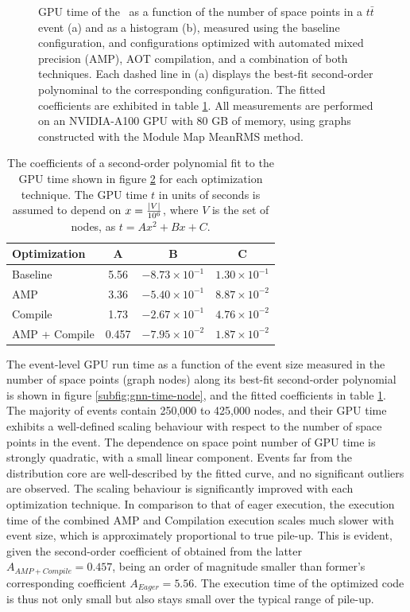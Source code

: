 \begin{figure}[h!]
\begin{subfigure}[b]{0.49\textwidth}
        \label{subfig:gnn-time-hist}
    \end{subfigure}
    \caption{GPU time of the \ignn~as a function of the number of space points in a $t\bar{t}$ event (a) and as a histogram (b), measured using the baseline configuration, and configurations optimized with automated mixed precision (AMP), AOT compilation, and a combination of both techniques. Each dashed line in (a) displays the best-fit second-order polynominal to the corresponding configuration. The fitted coefficients are exhibited in table \ref{tab:gnn-time-node-fit}. All measurements are performed on an NVIDIA-A100 GPU with 80 GB of memory, using graphs constructed with the Module Map MeanRMS method.}
    \label{fig:gnn-time-node}
\end{figure}

\begin{table}[ht]
    \centering
    \begin{tabular}{|l|c|c|c|} \hline
      {Optimization}   &  {A} & {B} & {C} \\ \hline 
      \hline
       Baseline  & 5.56 & $-8.73\times 10^{-1}$ & $1.30\times 10^{-1}$ \\
       AMP & 3.36 & $-5.40\times 10^{-1}$ & $8.87\times10^{-2}$ \\
       Compile & 1.73 & $-2.67\times 10^{-1}$  & $4.76\times 10^{-2}$ \\
       AMP + Compile & 0.457 & $-7.95\times 10^{-2}$ & $1.87\times 10^{-2}$ \\ \hline
    \end{tabular}
    \caption{The coefficients of a second-order polynomial fit to the GPU time shown in figure \ref{fig:gnn-time-node} for each optimization technique. The GPU time $t$ in units of seconds is assumed to depend on $x=\frac{\abs{V}}{10^6}$, where $V$ is the set of nodes, as $t=Ax^2+Bx+C$.}
    \label{tab:gnn-time-node-fit}
\end{table}
The event-level GPU run time as a function of the event size measured in the number of space points (graph nodes) along its best-fit second-order polynomial is shown in figure \ref{subfig:gnn-time-node}, and the fitted coefficients in table \ref{tab:gnn-time-node-fit}.
The majority of events contain 250,000 to 425,000 nodes, and their GPU time exhibits a well-defined scaling behaviour with respect to the number of space points in the event.
The dependence on space point number of GPU time is strongly quadratic, with a small linear component. 
Events far from the distribution core are well-described by the fitted curve, and no significant outliers are observed. 
The scaling behaviour is significantly improved with each optimization technique. 
In comparison to that of eager execution, the execution time of the combined AMP and Compilation execution scales much slower with event size, which is approximately proportional to true pile-up. 
This is evident, given the second-order coefficient of obtained from the latter $A_{AMP+Compile}=0.457$, being an order of magnitude smaller than former's corresponding coefficient $A_{Eager}=5.56$.
The execution time of the optimized code is thus not only small but also stays small over the typical range of pile-up.

